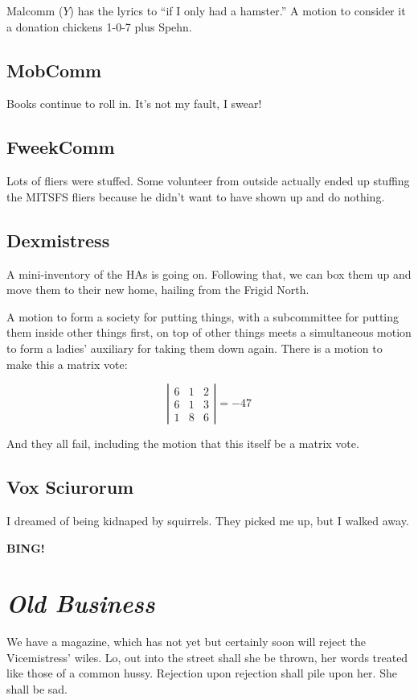 \documentclass[10pt]{article}
\newcommand{\bing}{{\bf BING!} }
\newcommand{\goto}[1]{\bing \vskip 12pt \section*{{\em{#1}}}}
\newcommand{\ps}{ plus Spehn\xspace}
\begin{document}
Malcomm ($Y$) has the lyrics to ``if I only had a hamster.''  A motion
to consider it a donation chickens 1-0-7\ps.


\subsection*{MobComm}
Books continue to roll in.  It's not my fault, I swear!

\subsection*{FweekComm}
Lots of fliers were stuffed.  Some volunteer from outside actually
ended up stuffing the MITSFS fliers because he didn't want to have
shown up and do nothing.

\subsection*{Dexmistress}
A mini-inventory of the HAs is going on.  Following that, we can box
them up and move them to their new home, hailing from the Frigid
North.

A motion to form a society for putting things, with a subcommittee for
putting them inside other things first, on top of other things meets
a simultaneous motion to form a ladies' auxiliary for taking them down
again.  There is a motion to make this a matrix vote:

\[
\left|
\begin{array}{ccc}
6 & 1 & 2 \\
6 & 1 & 3 \\
1 & 8 & 6
\end{array}
\right|
= -47
\]

And they all fail, including the motion that this itself be a matrix vote.

\subsection*{Vox Sciurorum}

I dreamed of being kidnaped by squirrels.  They picked me up, but I
walked away.

\goto{Old Business}

We have a magazine, which has not yet but certainly soon will reject
the Vicemistress' wiles.  Lo, out into the street shall she be thrown,
her words treated like those of a common hussy.  Rejection upon
rejection shall pile upon her.  She shall be sad.
\end{document}
